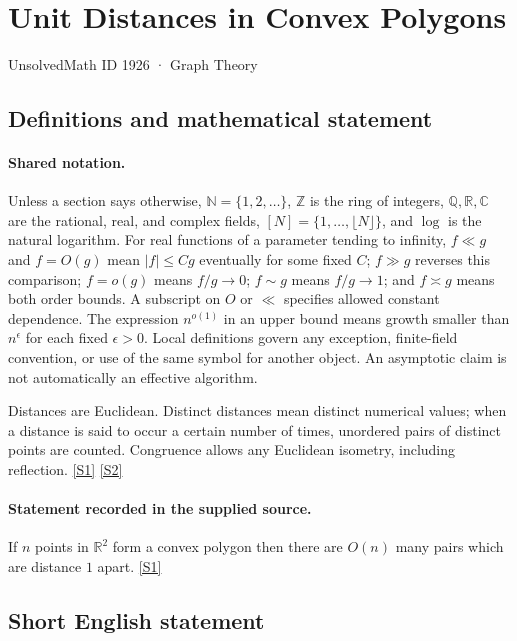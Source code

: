 \documentclass[11pt,a4paper]{article}
\newcommand{\N}{\mathbb{N}}
\newcommand{\Z}{\mathbb{Z}}
\newcommand{\Q}{\mathbb{Q}}
\newcommand{\R}{\mathbb{R}}
\newcommand{\C}{\mathbb{C}}
\newcommand{\sref}[2]{\hyperlink{source:#1:#2}{[S#2]}}
\begin{document}

\setcounter{section}{1925}

\section{Unit Distances in Convex Polygons}\label{1926}

{\small\sffamily UnsolvedMath ID 1926 · Graph Theory}

\subsection{Definitions and mathematical statement}

\paragraph{Shared notation.}Unless a section says otherwise, $\N=\{1,2,\ldots\}$,
$\Z$ is the ring of integers, $\Q,\R,\C$ are the rational, real, and complex
fields, $[N]=\{1,\ldots,\lfloor N\rfloor\}$, and $\log$ is the natural
logarithm. For real functions of a parameter tending to infinity,
$f\ll g$ and $f=O(g)$ mean $|f|\leq Cg$ eventually for some fixed $C$;
$f\gg g$ reverses this comparison; $f=o(g)$ means $f/g\to0$;
$f\sim g$ means $f/g\to1$; and $f\asymp g$ means both order bounds.
A subscript on $O$ or $\ll$ specifies allowed constant dependence.
The expression $n^{o(1)}$ in an upper bound means growth smaller than
$n^\epsilon$ for each fixed $\epsilon>0$. Local definitions govern any
exception, finite-field convention, or use of the same symbol for another
object. An asymptotic claim is not automatically an effective algorithm.



Distances are Euclidean. Distinct distances mean distinct numerical values; when a distance is said to occur a certain number of times, unordered pairs of distinct points are counted. Congruence allows any Euclidean isometry, including reflection. \sref{1926}{1} \sref{1926}{2}

\paragraph{Statement recorded in the supplied source.}
If $n$ points in $\mathbb{R}^2$ form a convex polygon then there are $O(n)$ many pairs which are distance $1$ apart. \sref{1926}{1}

\subsection{Short English statement}
\end{document}
